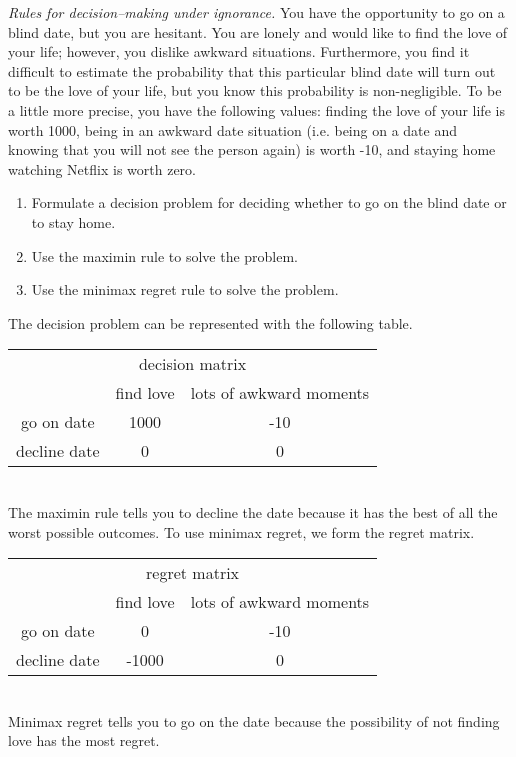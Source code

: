 \item \emph{Rules for decision--making under ignorance.}
  You have the opportunity to go on a
  blind date, but you are hesitant.  You are lonely and would like to
  find the love of your life; however, you dislike awkward
  situations. Furthermore, you find it difficult to estimate the
  probability that this particular blind date will turn out to be the
  love of your life, but you know this probability is
  non-negligible. To be a little more precise, you have the following
  values: finding the love of your life is worth 1000, being in an
  awkward date situation (i.e. being on a date and knowing that you
  will not see the person again) is worth -10, and staying home
  watching Netflix is worth zero.

\begin{enumerate}
\item Formulate a decision problem for deciding whether to go on the
blind date or to stay home.
\item Use the maximin rule to solve the problem.
\item Use the minimax regret rule to solve the problem.
\end{enumerate}

\begin{solution}
\bs The decision problem can be represented with the following table.
\\[.1in]
\begin{tabular}{ccc}
 \multicolumn{3}{c}{decision matrix} \\
 & find love & lots of awkward moments \\ \cline{2-3}
go on date & 1000 & -10 \\
decline date & 0 & 0 
\end{tabular}
\\[.1in] 
The maximin rule tells you to decline the date because it has
the best of all the worst possible outcomes. To use minimax regret, we
form the regret matrix.  \\[.1in]
\begin{tabular}{ccc}
 \multicolumn{3}{c}{regret matrix} \\
 & find love & lots of awkward moments \\ \cline{2-3}
go on date & 0 & -10 \\
decline date & -1000 & 0
\end{tabular}
\\[.1in] Minimax regret tells you to go on the date because the
possibility of not finding love has the most regret.
\end{solution}

